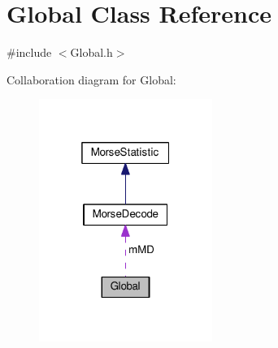 \hypertarget{classGlobal}{}\section{Global Class Reference}
\label{classGlobal}


{\ttfamily \#include $<$Global.\+h$>$}



Collaboration diagram for Global\+:
\nopagebreak
\begin{figure}[H]
\begin{center}
\leavevmode
\includegraphics[width=160pt]{classGlobal__coll__graph}
\end{center}
\end{figure}
